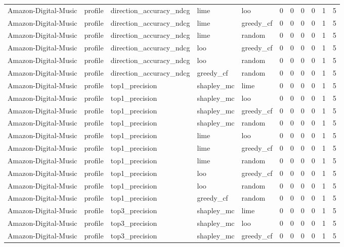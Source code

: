 \begin{table}[t]
{\begin{tabular}{lllllrrrrrr}
Amazon-Digital-Music & profile & direction\_accuracy\_ndcg & lime & loo & 0 & 0 & 0 & 0 & 1 & 5 \\
Amazon-Digital-Music & profile & direction\_accuracy\_ndcg & lime & greedy\_cf & 0 & 0 & 0 & 0 & 1 & 5 \\
Amazon-Digital-Music & profile & direction\_accuracy\_ndcg & lime & random & 0 & 0 & 0 & 0 & 1 & 5 \\
Amazon-Digital-Music & profile & direction\_accuracy\_ndcg & loo & greedy\_cf & 0 & 0 & 0 & 0 & 1 & 5 \\
Amazon-Digital-Music & profile & direction\_accuracy\_ndcg & loo & random & 0 & 0 & 0 & 0 & 1 & 5 \\
Amazon-Digital-Music & profile & direction\_accuracy\_ndcg & greedy\_cf & random & 0 & 0 & 0 & 0 & 1 & 5 \\
Amazon-Digital-Music & profile & top1\_precision & shapley\_mc & lime & 0 & 0 & 0 & 0 & 1 & 5 \\
Amazon-Digital-Music & profile & top1\_precision & shapley\_mc & loo & 0 & 0 & 0 & 0 & 1 & 5 \\
Amazon-Digital-Music & profile & top1\_precision & shapley\_mc & greedy\_cf & 0 & 0 & 0 & 0 & 1 & 5 \\
Amazon-Digital-Music & profile & top1\_precision & shapley\_mc & random & 0 & 0 & 0 & 0 & 1 & 5 \\
Amazon-Digital-Music & profile & top1\_precision & lime & loo & 0 & 0 & 0 & 0 & 1 & 5 \\
Amazon-Digital-Music & profile & top1\_precision & lime & greedy\_cf & 0 & 0 & 0 & 0 & 1 & 5 \\
Amazon-Digital-Music & profile & top1\_precision & lime & random & 0 & 0 & 0 & 0 & 1 & 5 \\
Amazon-Digital-Music & profile & top1\_precision & loo & greedy\_cf & 0 & 0 & 0 & 0 & 1 & 5 \\
Amazon-Digital-Music & profile & top1\_precision & loo & random & 0 & 0 & 0 & 0 & 1 & 5 \\
Amazon-Digital-Music & profile & top1\_precision & greedy\_cf & random & 0 & 0 & 0 & 0 & 1 & 5 \\
Amazon-Digital-Music & profile & top3\_precision & shapley\_mc & lime & 0 & 0 & 0 & 0 & 1 & 5 \\
Amazon-Digital-Music & profile & top3\_precision & shapley\_mc & loo & 0 & 0 & 0 & 0 & 1 & 5 \\
Amazon-Digital-Music & profile & top3\_precision & shapley\_mc & greedy\_cf & 0 & 0 & 0 & 0 & 1 & 5 \\

\end{tabular}}
\end{table}
